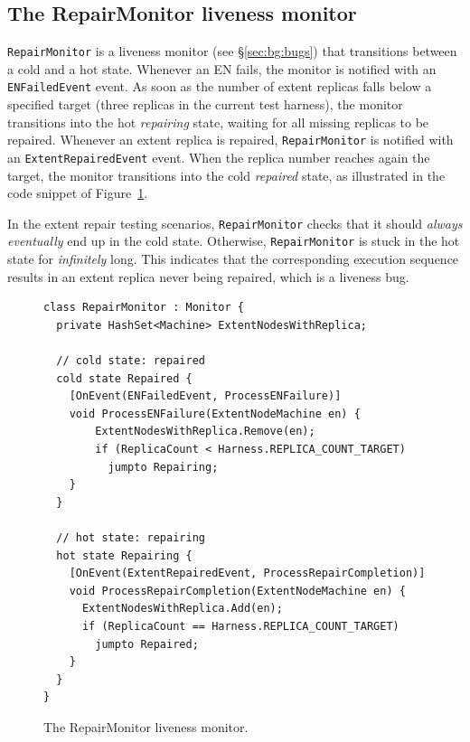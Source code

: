 \subsection{The RepairMonitor liveness monitor}
\label{sec:method:monitor}

\texttt{RepairMonitor} is a \psharp liveness monitor (see \S\ref{sec:bg:bugs}) that transitions between a cold and a hot state. Whenever an EN fails, the monitor is notified with an \texttt{ENFailedEvent} event. As soon as the number of extent replicas falls below a specified target (three replicas in the current \psharp test harness), the monitor transitions into the hot \emph{repairing} state, waiting for all missing replicas to be repaired. Whenever an extent replica is repaired, \texttt{RepairMonitor} is notified with an \texttt{ExtentRepairedEvent} event. When the replica number reaches again the target, the monitor transitions into the cold \emph{repaired} state, as illustrated in the code snippet of Figure~\ref{fig:monitor}.

In the extent repair testing scenarios, \texttt{RepairMonitor} checks that it should \emph{always eventually} end up in the cold state. Otherwise, \texttt{RepairMonitor} is stuck in the hot state for \emph{infinitely} long. This indicates that the corresponding execution sequence results in an extent replica never being repaired, which is a liveness bug.

\begin{figure}[t]
\begin{lstlisting}
class RepairMonitor : Monitor {
  private HashSet<Machine> ExtentNodesWithReplica;

  // cold state: repaired
  cold state Repaired {
    [OnEvent(ENFailedEvent, ProcessENFailure)]
    void ProcessENFailure(ExtentNodeMachine en) {
        ExtentNodesWithReplica.Remove(en);
        if (ReplicaCount < Harness.REPLICA_COUNT_TARGET)				
          jumpto Repairing;
    }
  }

  // hot state: repairing
  hot state Repairing {
    [OnEvent(ExtentRepairedEvent, ProcessRepairCompletion)]
    void ProcessRepairCompletion(ExtentNodeMachine en) {
      ExtentNodesWithReplica.Add(en);
      if (ReplicaCount == Harness.REPLICA_COUNT_TARGET)
        jumpto Repaired;
    }
  }
}
\end{lstlisting}
\vspace{-4mm}
\caption{The RepairMonitor liveness monitor.}
\label{fig:monitor}
\vspace{-2mm}
\end{figure}

